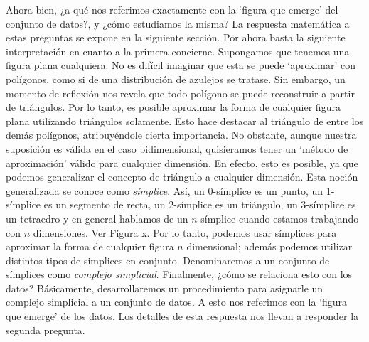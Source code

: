 \documentclass[a4paper,11pt]{article}
\begin{document}
Ahora bien, ¿a qué nos referimos exactamente con la `figura que emerge' del conjunto de datos?, y ¿cómo estudiamos la misma?
La respuesta matemática a estas preguntas se expone en la siguiente sección.
Por ahora basta la siguiente interpretación en cuanto a la primera concierne. 
Supongamos que tenemos una figura plana  cualquiera. No es difícil imaginar que esta se puede `aproximar' con polígonos, como si de una distribución de azulejos se tratase. Sin embargo, un momento de reflexión nos revela que todo polígono se puede reconstruir a partir de triángulos.
Por lo tanto, es posible aproximar la forma de cualquier figura plana utilizando triángulos solamente. Esto hace destacar al triángulo de entre los demás polígonos, atribuyéndole cierta importancia.
No obstante, aunque nuestra suposición es válida en el caso bidimensional, quisieramos tener un `método de aproximación' válido para cualquier dimensión. 
En efecto, esto es posible, ya que podemos  generalizar el concepto de triángulo a cualquier dimensión.  Esta noción generalizada se conoce como \textit{símplice}. Así, un 0-símplice es un punto, un 1-símplice es un segmento de recta, un 2-símplice es un triángulo, un 3-símplice es un tetraedro y en general hablamos de un \(n\)-símplice cuando estamos trabajando con \(n\) dimensiones. Ver Figura x.
Por lo tanto,  podemos usar símplices para aproximar la forma de cualquier figura \(n\) dimensional; además podemos utilizar distintos tipos de simplices en conjunto. Denominaremos a un  conjunto de símplices como \textit{complejo simplicial}.
Finalmente, ¿cómo se relaciona esto con los datos? Básicamente, desarrollaremos un procedimiento para asignarle un complejo simplicial a un conjunto de datos. A esto nos referimos con la `figura que emerge' de los datos. Los detalles de esta respuesta nos llevan a responder la segunda pregunta.
\end{document}
